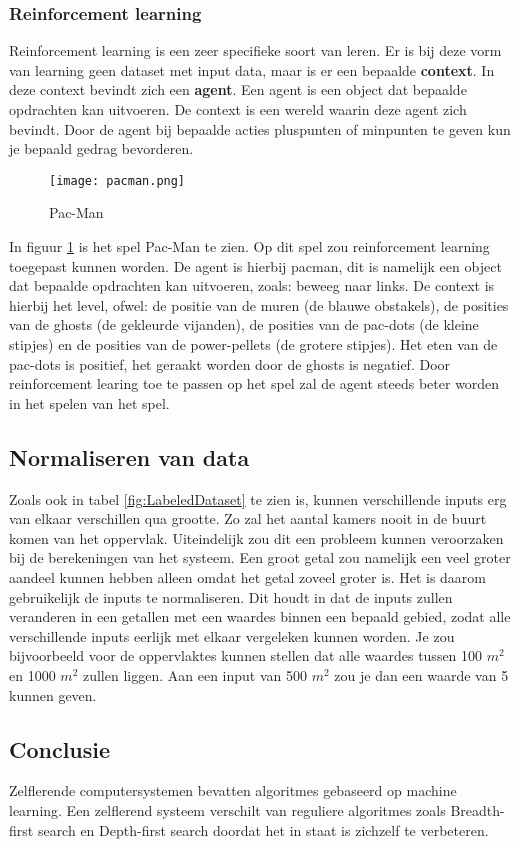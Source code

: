 \subsubsection{Reinforcement learning}
Reinforcement learning is een zeer specifieke soort van leren. Er is bij deze vorm van learning geen dataset met input data, maar is er een bepaalde \textbf{context}. In deze context bevindt zich een \textbf{agent}. Een agent is een object dat bepaalde opdrachten kan uitvoeren. De context is een wereld waarin deze agent zich bevindt. Door de agent bij bepaalde acties pluspunten of minpunten te geven kun je bepaald gedrag bevorderen.  

\begin{figure}[H]
  \centering
    \texttt{[image: pacman.png]}
  \caption{Pac-Man}
  \label{fig:Pacman}
\end{figure}

In figuur \ref{fig:Pacman} is het spel Pac-Man te zien. Op dit spel zou reinforcement learning toegepast kunnen worden. De agent is hierbij pacman, dit is namelijk een object dat bepaalde opdrachten kan uitvoeren, zoals: beweeg naar links. De context is hierbij het level, ofwel: de positie van de muren (de blauwe obstakels), de posities van de ghosts (de gekleurde vijanden), de posities van de pac-dots (de kleine stipjes) en de posities van de power-pellets (de grotere stipjes). Het eten van de pac-dots is positief, het geraakt worden door de ghosts is negatief. Door reinforcement learing toe te passen op het spel zal de agent steeds beter worden in het spelen van het spel. 

\subsection{Normaliseren van data}
Zoals ook in tabel \ref{fig:LabeledDataset} te zien is, kunnen verschillende inputs erg van elkaar verschillen qua grootte. Zo zal het aantal kamers nooit in de buurt komen van het oppervlak. Uiteindelijk zou dit een probleem kunnen veroorzaken bij de berekeningen van het systeem. Een groot getal zou namelijk een veel groter aandeel kunnen hebben alleen omdat het getal zoveel groter is. Het is daarom gebruikelijk de inputs te normaliseren. Dit houdt in dat de inputs zullen veranderen in een getallen met een waardes binnen een bepaald gebied, zodat alle verschillende inputs eerlijk met elkaar vergeleken kunnen worden. Je zou bijvoorbeeld voor de oppervlaktes kunnen stellen dat alle waardes tussen 100 $m^{2}$ en 1000 $m^{2}$ zullen liggen. Aan een input van 500 $m^{2}$ zou je dan een waarde van 5 kunnen geven.

\subsection{Conclusie}
Zelflerende computersystemen bevatten algoritmes gebaseerd op machine learning. Een zelflerend systeem verschilt van reguliere algoritmes zoals Breadth-first search en Depth-first search doordat het in staat is zichzelf te verbeteren.
